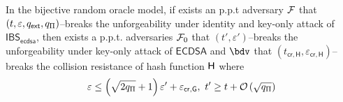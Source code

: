 \documentclass[version=submission, floatrow]{iacrcc}
\begin{document}
\begin{theorem}\label{thm: ufidkoa to ufkoa}
    In the bijective random oracle model, if exists an p.p.t adversary $\mathcal{F}$ that $\left(t, \varepsilon, q_{\mathsf{ext}}, q_{\Pi}\right)$--breaks the unforgeability under identity and key-only attack of $\mathsf{IBS}_{\mathsf{ecdsa}}$, then exists a p.p.t. adversaries $\mathcal{F}_{0}$ that $\left(t', \varepsilon'\right)$--breaks the unforgeability under key-only attack of $\mathsf{ECDSA}$ and $\bdv$ that $\left(t_{\mathsf{cr,H}}, \varepsilon_{\mathsf{cr, H}}\right)$--breaks the collision resistance of hash function $\mathsf{H}$ where
    \[
        \varepsilon \le \left(\sqrt{2q_{\Pi}} + 1\right)\varepsilon' + \varepsilon_{\mathsf{cr}, \mathsf{G}},\ t' \ge t + \mathcal{O}\left(\sqrt{q_{\Pi}}\right)
    \]
\end{theorem}
\end{document}
